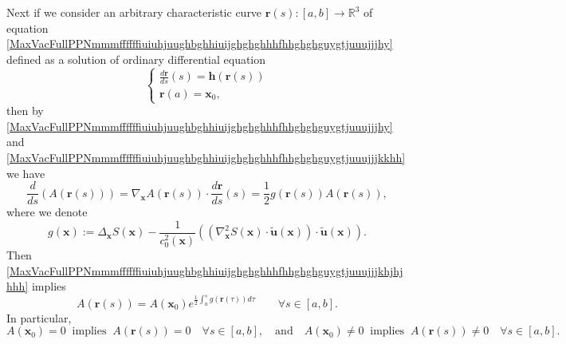 \documentclass{article}
\theoremstyle{definition}
\theoremstyle{remark}
\renewcommand{\vec}[1]{\mathbf{#1}}
\newcommand{\er}{\eqref}
\newcommand{\er}{\eqref}
\begin{document}
Next if we consider an arbitrary characteristic curve $\vec
r(s):[a,b]\to\mathbb{R}^3$ of equation
\er{MaxVacFullPPNmmmffffffiuiuhjuughbghhiuijghghghhhfhhghghguygtjuuujjjhy}
defined as a solution of ordinary differential equation
\begin{equation}\label{MaxVacFullPPNmmmffffffiuiuhjuughbghhiuijghghghhhfhhghghguygtjuuujjjkkhh}
\begin{cases}
\frac{d\vec r}{ds}(s)=\vec h\left(\vec
r(s)\right)\\
\vec r(a)=\vec x_0,
\end{cases}
\end{equation}
then by
\er{MaxVacFullPPNmmmffffffiuiuhjuughbghhiuijghghghhhfhhghghguygtjuuujjjhy}
and
\er{MaxVacFullPPNmmmffffffiuiuhjuughbghhiuijghghghhhfhhghghguygtjuuujjjkkhh}
we have
\begin{equation}\label{MaxVacFullPPNmmmffffffiuiuhjuughbghhiuijghghghhhfhhghghguygtjuuujjjkhjhjhhh}
\frac{d}{ds}\left(A\left(\vec r(s)\right)\right)=\nabla_{\vec
x}A\left(\vec r(s)\right)\cdot\frac{d\vec r}{ds}(s)= \frac{1}{2}
g\left(\vec r(s)\right)A\left(\vec r(s)\right),
\end{equation}
where we denote
\begin{equation}\label{MaxVacFullPPNmmmffffffiuiuhjuughbghhiuijghghghhhfhhghghguygtjuuujjjkhjhjhffgghhpiuuu}
g(\vec x):=\Delta_{\vec x}S(\vec x)-\frac{1}{c^2_0(\vec
x)}\left(\left(\nabla^2_{\vec x}S(\vec x)\cdot\vec {\tilde u}(\vec
x)\right)\cdot\vec {\tilde u}(\vec x)\right).
\end{equation}
Then
\er{MaxVacFullPPNmmmffffffiuiuhjuughbghhiuijghghghhhfhhghghguygtjuuujjjkhjhjhhh}
implies
\begin{equation}\label{MaxVacFullPPNmmmffffffiuiuhjuughbghhiuijghghghhhfhhghghguygtjuuujjjkhjhjhffgghh}
A\left(\vec r(s)\right)=A\left(\vec
x_0\right)e^{\frac{1}{2}\int_a^{s}g\left(\vec
r(\tau)\right)d\tau}\quad\quad\forall s\in[a,b].
\end{equation}
In particular,
\begin{equation}\label{MaxVacFullPPNmmmffffffiuiuhjuughbghhiuijghghghhhfhhghghguygtjuuujjjkhjhjhffggiouuiiuhh}
A\left(\vec x_0\right)=0\;\;\text{implies}\;\; A\left(\vec
r(s)\right)=0\quad\forall s\in[a,b],\quad\text{and}\quad A\left(\vec
x_0\right)\neq 0\;\;\text{implies}\;\; A\left(\vec r(s)\right)\neq
0\quad\forall s\in[a,b].
\end{equation}
\end{document}
